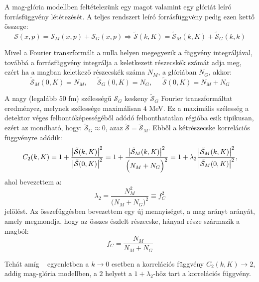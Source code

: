 \documentclass[10pt,a4paper]{article}
\numberwithin{equation}{subsection}
\numberwithin{figure}{section}
\begin{document}
A mag-glória modellben feltételezünk egy magot valamint egy glóriát leíró forrásfüggvény lététezését. A teljes rendszert leíró forrásfüggvény pedig ezen kettő összege:
\begin{equation}
\mathcal{S}(x,p)=\mathcal{S}_M(x,p)+ \mathcal{S}_G(x,p)\Longrightarrow \mathcal{\tilde{S}}(k, K) = \mathcal{\tilde{S}}_M(k,K)+\mathcal{\tilde{S}}_G(k,k)
\end{equation}

Mivel a Fourier transzformált a nulla helyen megegyezik a függvény integráljával, továbbá a forrásfüggvény integrálja a keletkezett részecskék számát adja meg, ezért ha a magban keletkező részecskék száma $N_M$, a glóriában $N_G$, akkor:
\begin{equation}
\mathcal{\tilde{S}}_M(0,K) = N_M,\;\;\;\;\; 
\mathcal{\tilde{S}}_G(0,K) = N_G,\;\;\;\;\;
\mathcal{\tilde{S}}(0,K) = N_M+N_G
\end{equation}

A nagy (legalább $50$ fm) szélességű $\mathcal{S}_G$ keskeny $\mathcal{\tilde{S}}_G$ Fourier transzformáltat eredményez, melynek  szélessége maximálisan $4$ MeV. Ez a maximális szélesség a detektor véges felbontóképességéből adódó felbonthatatlan régióba esik tipikusan, ezért az mondható, hogy: $\mathcal{\tilde{S}}_G\approx 0$, azaz $\mathcal{\tilde{S}}=\mathcal{\tilde{S}}_M$. Ebből a kétrészecske korrelációs függvényre adódik:
\begin{equation}
C_2({k}, {K})=1+\frac{\abs{\tilde{\mathcal{S}}({k},{K})}^2}{\abs{\tilde{\mathcal{S}}(0,{K})}^2} =
1+\frac{\abs{\tilde{\mathcal{S}}_M({k},{K})}^2}{\Big(N_M+N_G\Big)^2}
 =
  1+\lambda_2\frac{\abs{\tilde{\mathcal{S}}_M({k},{K})}^2}{\abs{\tilde{\mathcal{S}}_M(0,{K})}^2},
\end{equation}
ahol bevezettem a:
\begin{equation}
\lambda_2=\frac{N_M^2}{\Big(N_M+N_G\Big)^2} \equiv f_C^2
\label{eq:CHlambda2}
\end{equation}
jelölést. Az összefüggésben bevezettem egy új mennyiséget, a mag arányt arányát, amely megmondja, hogy az összes észlelt részecske, hányad része származik a magból:
\begin{equation}
f_C=\frac{N_M}{N_M+N_G}
\label{eq:fC}
\end{equation}

Tehát amíg ~ egyenletben a $k\rightarrow 0$ esetben a korrelációs függvény $C_2(k,K)\rightarrow 2$, addig mag-glória modellben, a $2$ helyett a $1+\lambda_2$-höz tart a korrelációs függvény.
\end{document}
